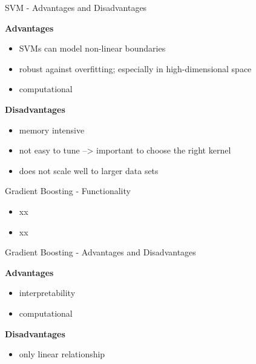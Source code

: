 \documentclass[11pt,compress,t,notes=noshow, xcolor=table]{beamer}
\begin{document}
\begin{frame}{SVM - Advantages and Disadvantages}

\textbf{Advantages}
\begin{itemize}
\item SVMs can model non-linear boundaries
\item robust against overfitting; especially in high-dimensional space
\item computational 
\end{itemize}


\textbf{Disadvantages}
\begin{itemize}
\item memory intensive
\item not easy to tune --> important to choose the right kernel 
\item does not scale well to larger data sets
\end{itemize}
\end{frame}



\begin{frame}{Gradient Boosting - Functionality}

\begin{itemize}
\item xx
\item xx
\end{itemize}


\end{frame}

\begin{frame}{Gradient Boosting - Advantages and Disadvantages}

\textbf{Advantages}
\begin{itemize}
\item interpretability
\item computational 
\end{itemize}


\textbf{Disadvantages}
\begin{itemize}
\item only linear relationship
\end{itemize}
\end{frame}


\end{document}
